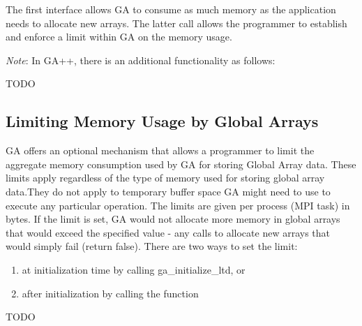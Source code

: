 The first interface allows GA to consume as much memory as the application
needs to allocate new arrays. The latter call allows the programmer to
establish and enforce a limit within GA on the memory usage.

\emph{Note}: In GA++, there is an additional functionality as follows: 

TODO 

\subsection{Limiting Memory Usage by Global Arrays}

GA offers an optional mechanism that allows a programmer to limit the aggregate
memory consumption used by GA for storing Global Array data. These limits apply
regardless of the type of memory used for storing global array data.They do not
apply to temporary buffer space GA might need to use to execute any particular
operation. The limits are given per process (MPI task) in bytes. If the limit
is set, GA would not allocate more memory in global arrays that would exceed
the specified value - any calls to allocate new arrays that would simply fail
(return false). There are two ways to set the limit:
\begin{enumerate}
\item at initialization time by calling ga\_initialize\_ltd, or 
\item after initialization by calling the function
\end{enumerate}

TODO


